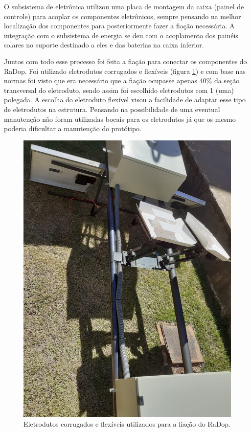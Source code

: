 O subsistema de eletrônica utilizou uma placa de montagem da caixa (painel de controle) para acoplar os componentes eletrônicos, sempre pensando na melhor localização dos componentes para posteriormente fazer a fiação necessária. A integração com o subsistema de energia se deu com o acoplamento dos painéis solares no suporte destinado a eles e das baterias na caixa inferior. 

Juntos com todo esse processo foi feita a fiação para conectar os componentes do RaDop. Foi utilizado eletrodutos corrugados e flexíveis (figura \ref{eletrodutos}) e com base nas normas foi visto que era necessário que a fiação ocupasse apenas 40\% da seção transversal do eletroduto, sendo assim foi escolhido eletrodutos com 1 (uma) polegada. A escolha do eletroduto flexível visou a facilidade de adaptar esse tipo de eletrodutos na estrutura. Pensando na possibilidade de uma eventual manutenção não foram utilizadas bocais para os eletrodutos já que os mesmo poderia dificultar a manutenção do protótipo.

\begin{figure}[H]
	\centering
    \includegraphics[keepaspectratio=true, scale=0.5]{figuras/eletroduto.jpeg}
    \caption{Eletrodutos corrugados e flexíveis utilizados para a fiação do RaDop.}
    \label{eletrodutos}
\end{figure}

